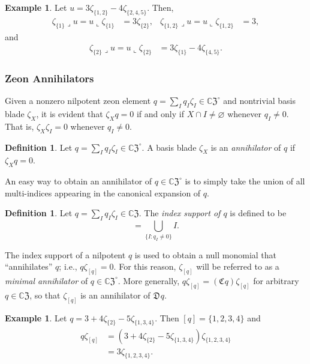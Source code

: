 \documentclass{article}
\theoremstyle{definition}
\newtheorem{definition}[theorem]{Definition}
\newtheorem{example}[theorem]{Example}
\newcommand{\zco}{\mathfrak{C}\mspace{1mu}}
\newcommand{\zdu}{\mathfrak{D}\mspace{1mu}}
\newcommand{\CZ}{\mathbb{C}\mathfrak{Z}}
\numberwithin{equation}{section}
\begin{document}
\begin{example}
Let $u=3\zeta_{\{1,2\}}-4\zeta_{\{2,4,5\}}$.  Then,
\begin{align*}
\zeta_{\{1\}}\lrcorner u=u\llcorner \zeta_{\{1\}}&=3\zeta_{\{2\}},&\zeta_{\{1,2\}}\lrcorner u=u\llcorner \zeta_{\{1,2\}}&=3,
\end{align*}
and
\begin{align*}
\zeta_{\{2\}}\lrcorner u=u\llcorner \zeta_{\{2\}}&=3\zeta_{\{1\}}-4\zeta_{\{4,5\}}.
\end{align*}

\end{example}

\subsubsection{Zeon Annihilators}

Given a nonzero nilpotent zeon element  $q=\sum_{I}q_I\zeta_I\in\CZ^\circ$ and nontrivial basis blade $\zeta_X$, it is evident that $\zeta_{X} q=0$ if and only if $X\cap I\ne\varnothing$ whenever $q_I\ne 0$.  That is, $\zeta_X\zeta_I=0$ whenever $q_I\ne 0$.  

\begin{definition}
Let $q=\sum_{I}q_I\zeta_I\in\CZ^\circ$.  A basis blade $\zeta_X$ is an {\em annihilator} of $q$ if $\zeta_X q=0$.  
\end{definition}

An easy way to obtain an annihilator of $q\in\CZ^\circ$ is to simply take the union of all multi-indices appearing in the canonical expansion of $q$.  

\begin{definition}\label{index support def}
Let $q=\sum_{I}q_I\zeta_I\in\CZ$.  The {\em index support of $q$} is defined to be \begin{equation}
[q]=\bigcup_{\{I: q_I\ne 0\}}I.
\end{equation}
\end{definition}

The index support of a nilpotent $q$ is used to obtain a null monomial that ``annihilates'' $q$; i.e., $q\zeta_{[q]}=0$.   For this reason, $\zeta_{[q]}$ will be referred to as a {\em minimal annihilator} of $q\in\CZ^\circ$.  More generally, $q\zeta_{[q]}=(\zco q) \zeta_{[q]}$ for arbitrary $q\in\CZ$, so that $\zeta_{[q]}$ is an annihilator of $\zdu q$. 

\begin{example}
Let $q=3+4\zeta_{\{2\}}-5\zeta_{\{1,3,4\}}.$  Then $[q]=\{1,2,3,4\}$ and 
\begin{align*}
q\zeta_{[q]}&=(3+4\zeta_{\{2\}}-5\zeta_{\{1,3,4\}})\zeta_{\{1,2,3,4\}}\\
&=3\zeta_{\{1,2,3,4\}}.
\end{align*}  
\end{example}
\end{document}
